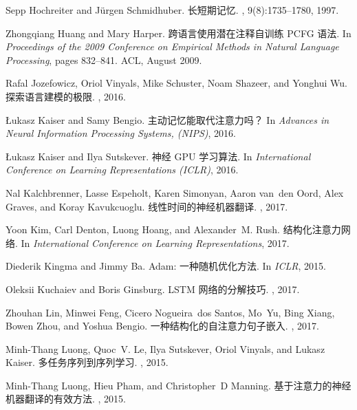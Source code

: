 \documentclass{article}
\begin{document}
\begin{thebibliography}{10}
Sepp Hochreiter and J{\"u}rgen Schmidhuber.
\newblock 长短期记忆.
, 9(8):1735--1780, 1997.

Zhongqiang Huang and Mary Harper.
\newblock 跨语言使用潜在注释自训练 PCFG 语法.
\newblock In {\em Proceedings of the 2009 Conference on Empirical Methods in
  Natural Language Processing}, pages 832--841. ACL, August 2009.

Rafal Jozefowicz, Oriol Vinyals, Mike Schuster, Noam Shazeer, and Yonghui Wu.
\newblock 探索语言建模的极限.
, 2016.

{\L}ukasz Kaiser and Samy Bengio.
\newblock 主动记忆能取代注意力吗？
\newblock In {\em Advances in Neural Information Processing Systems, ({NIPS})},
  2016.

\L{}ukasz Kaiser and Ilya Sutskever.
\newblock 神经 GPU 学习算法.
\newblock In {\em International Conference on Learning Representations
  ({ICLR})}, 2016.

Nal Kalchbrenner, Lasse Espeholt, Karen Simonyan, Aaron van~den Oord, Alex
  Graves, and Koray Kavukcuoglu.
\newblock 线性时间的神经机器翻译.
, 2017.

Yoon Kim, Carl Denton, Luong Hoang, and Alexander~M. Rush.
\newblock 结构化注意力网络.
\newblock In {\em International Conference on Learning Representations}, 2017.

Diederik Kingma and Jimmy Ba.
\newblock Adam: 一种随机优化方法.
\newblock In {\em ICLR}, 2015.

Oleksii Kuchaiev and Boris Ginsburg.
\newblock LSTM 网络的分解技巧.
, 2017.

Zhouhan Lin, Minwei Feng, Cicero Nogueira~dos Santos, Mo~Yu, Bing Xiang, Bowen
  Zhou, and Yoshua Bengio.
\newblock 一种结构化的自注意力句子嵌入.
, 2017.

Minh-Thang Luong, Quoc~V. Le, Ilya Sutskever, Oriol Vinyals, and Lukasz Kaiser.
\newblock 多任务序列到序列学习.
, 2015.

Minh-Thang Luong, Hieu Pham, and Christopher~D Manning.
\newblock 基于注意力的神经机器翻译的有效方法.
, 2015.


\end{thebibliography}
\end{document}
